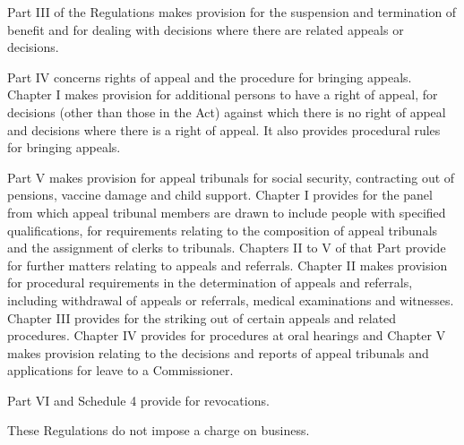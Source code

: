 \documentclass[12pt,a4paper]{article}
\begin{document}
  Part III of the Regulations makes provision for the suspension and termination of benefit and for dealing with decisions where there are related appeals or decisions.

  Part IV concerns rights of appeal and the procedure for bringing appeals. Chapter I makes provision for additional persons to have a right of appeal, for decisions (other than those in the Act) against which there is no right of appeal and decisions where there is a right of appeal. It also provides procedural rules for bringing appeals.

  Part V makes provision for appeal tribunals for social security, contracting out of pensions, vaccine damage and child support. Chapter I provides for the panel from which appeal tribunal members are drawn to include people with specified qualifications, for requirements relating to the composition of appeal tribunals and the assignment of clerks to tribunals. Chapters II to V of that Part provide for further matters relating to appeals and referrals. Chapter II makes provision for procedural requirements in the determination of appeals and referrals, including withdrawal of appeals or referrals, medical examinations and witnesses. Chapter III provides for the striking out of certain appeals and related procedures. Chapter IV provides for procedures at oral hearings and Chapter V makes provision relating to the decisions and reports of appeal tribunals and applications for leave to a Commissioner.

  Part VI and Schedule 4 provide for revocations.

  These Regulations do not impose a charge on business.
\end{document}
